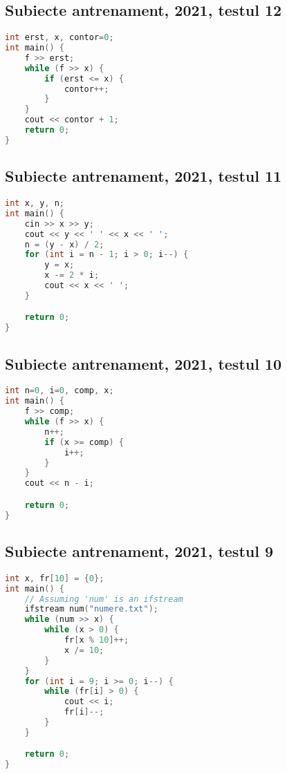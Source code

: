 \documentclass[10pt, a4paper, twocolumn]{article}
\begin{document}
\subsection*{Subiecte antrenament, 2021, testul 12}
\begin{lstlisting}[language=C++]
int erst, x, contor=0;
int main() {
    f >> erst;
    while (f >> x) {
        if (erst <= x) {
            contor++;
        }
    }
    cout << contor + 1;
    return 0;
}
\end{lstlisting}

\subsection*{Subiecte antrenament, 2021, testul 11}
\begin{lstlisting}[language=C++]
int x, y, n;
int main() {
    cin >> x >> y;
    cout << y << ' ' << x << ' ';
    n = (y - x) / 2;
    for (int i = n - 1; i > 0; i--) {
        y = x;
        x -= 2 * i;
        cout << x << ' ';
    }

    return 0;
}
\end{lstlisting}

\newpage
\subsection*{Subiecte antrenament, 2021, testul 10}
\begin{lstlisting}[language=C++]
int n=0, i=0, comp, x;
int main() {
    f >> comp;
    while (f >> x) {
        n++;
        if (x >= comp) {
            i++;
        }
    }
    cout << n - i;

    return 0;
}
\end{lstlisting}


\subsection*{Subiecte antrenament, 2021, testul 9}
\begin{lstlisting}[language=C++]
int x, fr[10] = {0};
int main() {
    // Assuming 'num' is an ifstream
    ifstream num("numere.txt");
    while (num >> x) {
        while (x > 0) {
            fr[x % 10]++;
            x /= 10;
        }
    }
    for (int i = 9; i >= 0; i--) {
        while (fr[i] > 0) {
            cout << i;
            fr[i]--;
        }
    }

    return 0;
}
\end{lstlisting}
\end{document}
